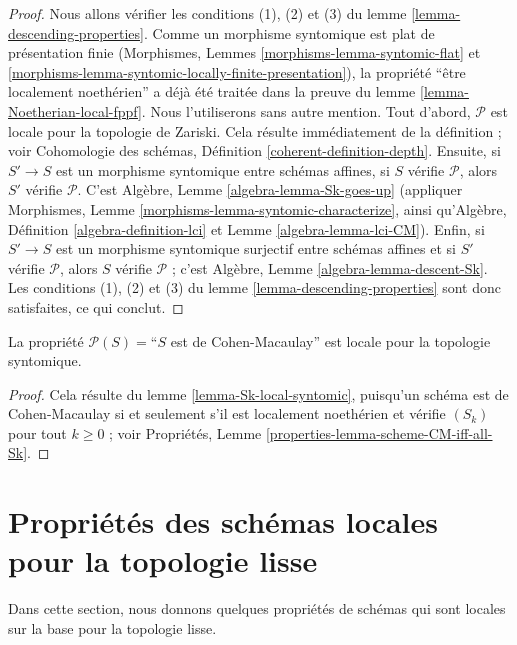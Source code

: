 \begin{proof}
Nous allons vérifier les conditions (1), (2) et (3) du lemme
\ref{lemma-descending-properties}. Comme un morphisme syntomique est plat de
présentation finie (Morphismes, Lemmes
\ref{morphisms-lemma-syntomic-flat} et
\ref{morphisms-lemma-syntomic-locally-finite-presentation}), la propriété
``être localement noethérien'' a déjà été traitée dans la preuve du
lemme \ref{lemma-Noetherian-local-fppf}. Nous l'utiliserons sans autre
mention. Tout d'abord, $\mathcal{P}$ est locale pour la topologie de Zariski.
Cela résulte immédiatement de la définition ; voir Cohomologie des schémas,
Définition \ref{coherent-definition-depth}. Ensuite, si $S' \to S$ est un
morphisme syntomique entre schémas affines, si $S$ vérifie $\mathcal{P}$,
alors $S'$ vérifie $\mathcal{P}$. C'est Algèbre, Lemme
\ref{algebra-lemma-Sk-goes-up} (appliquer Morphismes, Lemme
\ref{morphisms-lemma-syntomic-characterize}, ainsi qu'Algèbre, Définition
\ref{algebra-definition-lci} et Lemme \ref{algebra-lemma-lci-CM}).
Enfin, si $S' \to S$ est un morphisme syntomique surjectif entre schémas
affines et si $S'$ vérifie $\mathcal{P}$, alors $S$ vérifie $\mathcal{P}$ ;
c'est Algèbre, Lemme \ref{algebra-lemma-descent-Sk}.
Les conditions (1), (2) et (3) du lemme
\ref{lemma-descending-properties} sont donc satisfaites, ce qui conclut.
\end{proof}

\begin{lemma}
\label{lemma-CM-local-syntomic}
La propriété $\mathcal{P}(S) =$``$S$ est de Cohen-Macaulay'' est locale pour
la topologie syntomique.
\end{lemma}

\begin{proof}
Cela résulte du lemme \ref{lemma-Sk-local-syntomic}, puisqu'un schéma est de
Cohen-Macaulay si et seulement s'il est localement noethérien et vérifie
$(S_k)$ pour tout $k \geq 0$ ; voir Propriétés, Lemme
\ref{properties-lemma-scheme-CM-iff-all-Sk}.
\end{proof}







\section{Propriétés des schémas locales pour la topologie lisse}
\label{section-descending-properties-smooth}

\noindent
Dans cette section, nous donnons quelques propriétés de schémas qui sont
locales sur la base pour la topologie lisse.

